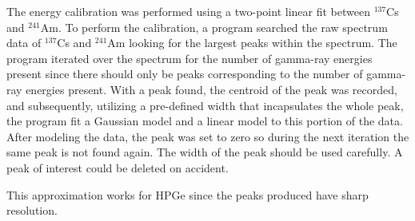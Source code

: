 The energy calibration was performed using a two-point linear fit between
$^{137}$Cs and $^{241}$Am. To perform the calibration, a program searched
the raw spectrum data of $^{137}$Cs and $^{241}$Am looking for
the largest peaks within the spectrum. The program iterated over the spectrum for the
number of gamma-ray energies present since there should only be peaks corresponding
to the number of gamma-ray energies present. With a peak found, the centroid of the peak was
recorded, and subsequently, utilizing a pre-defined width that incapsulates
the whole peak, the program fit a Gaussian model and
a linear model to this portion of the data. After modeling the data, the peak was
set to zero so during the next iteration the same peak is not found again.
The width of the peak should be used carefully. A peak of interest could be deleted on accident.

This approximation works for HPGe since the peaks produced have sharp resolution.
